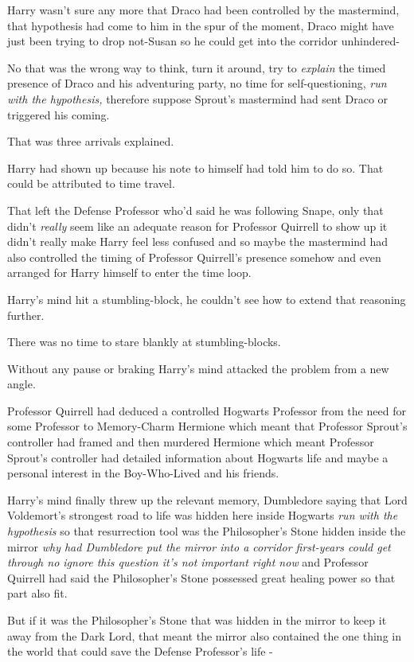 Harry wasn't sure any more that Draco had been controlled by the mastermind, that hypothesis had come to him in the spur of the moment, Draco might have just been trying to drop not-Susan so he could get into the corridor unhindered-

No that was the wrong way to think, turn it around, try to \emph{explain} the timed presence of Draco and his adventuring party, no time for self-questioning, \emph{run with the hypothesis,} therefore suppose Sprout's mastermind had sent Draco or triggered his coming.

That was three arrivals explained.

Harry had shown up because his note to himself had told him to do so. That could be attributed to time travel.

That left the Defense Professor who'd said he was following Snape, only that didn't \emph{really} seem like an adequate reason for Professor Quirrell to show up it didn't really make Harry feel less confused and so maybe the mastermind had also controlled the timing of Professor Quirrell's presence somehow and even arranged for Harry himself to enter the time loop.

Harry's mind hit a stumbling-block, he couldn't see how to extend that reasoning further.

There was no time to stare blankly at stumbling-blocks.

Without any pause or braking Harry's mind attacked the problem from a new angle.

Professor Quirrell had deduced a controlled Hogwarts Professor from the need for some Professor to Memory-Charm Hermione which meant that Professor Sprout's controller had framed and then murdered Hermione which meant Professor Sprout's controller had detailed information about Hogwarts life and maybe a personal interest in the Boy-Who-Lived and his friends.

Harry's mind finally threw up the relevant memory, Dumbledore saying that Lord Voldemort's strongest road to life was hidden here inside Hogwarts \emph{run with the hypothesis} so that resurrection tool was the Philosopher's Stone hidden inside the mirror \emph{why had Dumbledore put the mirror into a corridor first-years could get through no ignore this question it's not important right now} and Professor Quirrell had said the Philosopher's Stone possessed great healing power so that part also fit.

But if it was the Philosopher's Stone that was hidden in the mirror to keep it away from the Dark Lord, that meant the mirror also contained the one thing in the world that could save the Defense Professor's life -

